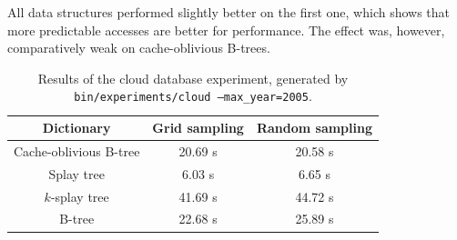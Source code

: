 All data structures performed slightly better on the first one, which shows
that more predictable accesses are better for performance. The effect was,
however, comparatively weak on cache-oblivious B-trees.

\begin{table}
\centering
\begin{tabular}{|c|c|c|}
%
	\hline
	Dictionary & Grid sampling & Random sampling \\
	\hline

	Cache-oblivious B-tree & 20.69 s & 20.58 s \\
	\hline
	Splay tree & 6.03 s & 6.65 s \\
	\hline
	$k$-splay tree & 41.69 s & 44.72 s \\
	\hline
	B-tree & 22.68 s & 25.89 s \\
	\hline
\end{tabular}
\caption{Results of the cloud database experiment, generated
	by \texttt{bin/experiments/cloud --max\_year=2005}.
}
\label{tab:cloud-results}
\end{table}
